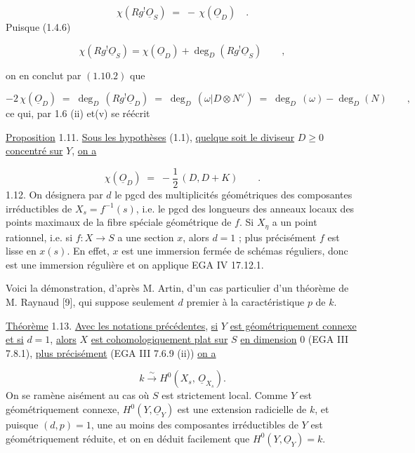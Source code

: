 \begin{equation*}
\chi(Rg^{!}\underline{O}_S) \;=\; -\,\chi(\underline{O}_D) \quad .
\end{equation*}
Puisque (1.4.6)

\begin{equation*}
\chi(Rg^{!}\underline{O}_S) = \chi(\underline{O}_D) + \deg_D(Rg^{!}\underline{O}_S) \qquad , 
\end{equation*}


 on en conclut par $(1.10.2)$ que

\begin{equation*}
- 2\,\chi(\underline{O}_D) \;=\; \deg_D\,(Rg^{!}\underline{O}_D) \;=\; \deg_D\,(\omega|D \otimes N^{\vee}) \;=\; \deg_D\,(\omega) - \deg_D(N) \qquad ,
\end{equation*}
ce qui, par 1.6 (ii) et(v) se réécrit

\underline{Proposition} 1.11. \underline{Sous les hypothèses} (1.1), \underline{quelque soit le diviseur} $D \geq 0$ \underline{concentré sur} $Y$, \underline{on a}

\begin{equation*}
\chi(\underline{O}_D) \;=\; - \frac{1}{2}\,(D,D+K) \qquad .
\end{equation*}
1.12. On désignera par $d$ le pgcd des multiplicités géométriques des composantes irréductibles de $X_s = f^{-1}(s)$, i.e. le pgcd des longueurs des anneaux locaux des points maximaux de la fibre spéciale géométrique de $f$. Si $X_{\eta}$ a un point rationnel, i.e. si $f : X \longrightarrow S$ a une section $x$, alors $d = 1$ ; plus précisément $f$ est lisse en $x(s)$. En effet, $x$ est une immersion fermée de schémas réguliers, donc est une immersion régulière et on applique EGA IV 17.12.1.

Voici la démonstration, d'après M. Artin, d'un cas particulier d'un théorème de M. Raynaud [9], qui suppose seulement $d$ premier à la caractéristique $p$ de $k$.

\underline{Théorème} 1.13. \underline{Avec les notations précédentes}, \underline{si} $Y$ \underline{est géométriquement connexe et si} $d = 1$, \underline{alors} $X$ \underline{est cohomologiquement plat sur} $S$ \underline{en dimension} 0 (EGA III 7.8.1), \underline{plus précisément} (EGA III 7.6.9 (ii)) \underline{on a}

\begin{equation*}
k \xrightarrow{\;\sim\;} H^0(X_s,\, \underline{O}_{X_s}).
\end{equation*}
On se ramène aisément au cas où $S$ est strictement local. Comme $Y$ est géométriquement connexe, $H^0(Y,\underline{O}_Y)$ est une extension radicielle de $k$, et puisque $(d,p)=1$, une au moins des composantes irréductibles de $Y$ est
géométriquement réduite, et on en déduit facilement que $H^0(Y,\underline{O}_Y) = k$.

